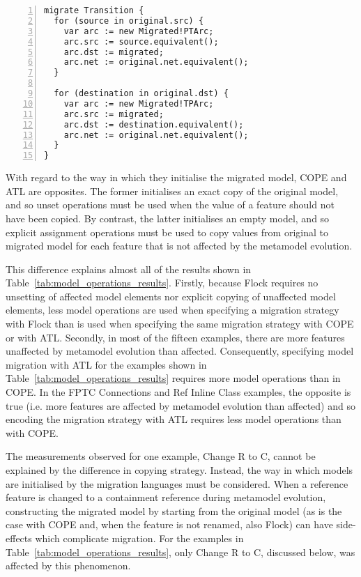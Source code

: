 \begin{lstlisting}[basicstyle=\ttfamily\footnotesize, flexiblecolumns=true, numbers=left, nolol=true, caption=Petri nets model migration in Flock, label=lst:quantitive_flock, language=Flock, tabsize=2]
migrate Transition {
  for (source in original.src) {
    var arc := new Migrated!PTArc;
    arc.src := source.equivalent();
    arc.dst := migrated;
    arc.net := original.net.equivalent();
  }

  for (destination in original.dst) {
    var arc := new Migrated!TPArc;
    arc.src := migrated;
    arc.dst := destination.equivalent();
    arc.net := original.net.equivalent();
  }
}
\end{lstlisting}

With regard to the way in which they initialise the migrated model, COPE and ATL are opposites. The former initialises an exact copy of the original model, and so unset operations must be used when the value of a feature should not have been copied. By contrast, the latter initialises an empty model, and so explicit assignment operations must be used to copy values from original to migrated model for each feature that is not affected by the metamodel evolution.

This difference explains almost all of the results shown in Table~\ref{tab:model_operations_results}. Firstly, because Flock requires no unsetting of affected model elements nor explicit copying of unaffected model elements, less model operations are used when specifying a migration strategy with Flock than is used when specifying the same migration strategy with COPE or with ATL. Secondly, in most of the fifteen examples, there are more features unaffected by metamodel evolution than affected. Consequently, specifying model migration with ATL for the examples shown in Table~\ref{tab:model_operations_results} requires more model operations than in COPE. In the FPTC Connections and Ref Inline Class examples, the opposite is true (i.e. more features are affected by metamodel evolution than affected) and so encoding the migration strategy with ATL requires less model operations than with COPE. 


The measurements observed for one example, Change R to C, cannot be explained by the difference in copying strategy. Instead, the way in which models are initialised by the migration languages must be considered. When a reference feature is changed to a containment reference during metamodel evolution, constructing the migrated model by starting from the original model (as is the case with COPE and, when the feature is not renamed, also Flock) can have side-effects which complicate migration. For the examples in Table~\ref{tab:model_operations_results}, only Change R to C, discussed below, was affected by this phenomenon.

